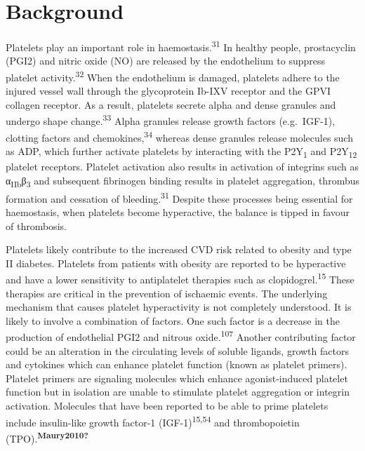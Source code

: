 \documentclass[11pt,twoside]{bristolthesis}
\begin{document}
\hypertarget{background-3}{%
\section{Background}\label{background-3}}

Platelets play an important role in haemostasis.\textsuperscript{31} In healthy people, prostacyclin (PGI2) and nitric oxide (NO) are released by the endothelium to suppress platelet activity.\textsuperscript{32} When the endothelium is damaged, platelets adhere to the injured vessel wall through the glycoprotein Ib-IXV receptor and the GPVI collagen receptor. As a result, platelets secrete alpha and dense granules and undergo shape change.\textsuperscript{33} Alpha granules release growth factors (e.g.~IGF-1), clotting factors and chemokines,\textsuperscript{34} whereas dense granules release molecules such as ADP, which further activate platelets by interacting with the P2Y\textsubscript{1} and P2Y\textsubscript{12} platelet receptors. Platelet activation also results in activation of integrins such as α\textsubscript{IIb}β\textsubscript{3} and subsequent fibrinogen binding results in platelet aggregation, thrombus formation and cessation of bleeding.\textsuperscript{31} Despite these processes being essential for haemostasis, when platelets become hyperactive, the balance is tipped in favour of thrombosis.

Platelets likely contribute to the increased CVD risk related to obesity and type II diabetes. Platelets from patients with obesity are reported to be hyperactive and have a lower sensitivity to antiplatelet therapies such as clopidogrel.\textsuperscript{15} These therapies are critical in the prevention of ischaemic events. The underlying mechanism that causes platelet hyperactivity is not completely understood. It is likely to involve a combination of factors. One such factor is a decrease in the production of endothelial PGI2 and nitrous oxide.\textsuperscript{107} Another contributing factor could be an alteration in the circulating levels of soluble ligands, growth factors and cytokines which can enhance platelet function (known as platelet primers). Platelet primers are signaling molecules which enhance agonist-induced platelet function but in isolation are unable to stimulate platelet aggregation or integrin activation. Molecules that have been reported to be able to prime platelets include insulin-like growth factor-1 (IGF-1)\textsuperscript{15,54} and thrombopoietin (TPO).\textsuperscript{\textbf{Maury2010?}}
\end{document}
